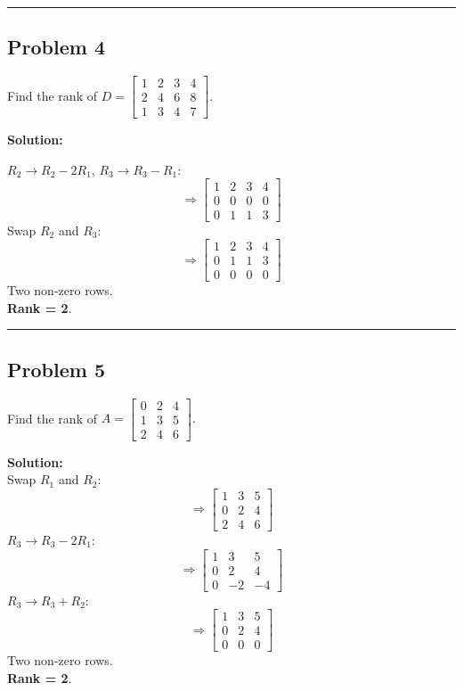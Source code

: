 \documentclass[
  letterpaper,
  DIV=11,
  numbers=noendperiod]{scrreprt}
\begin{document}
\begin{center}\rule{0.5\linewidth}{0.5pt}\end{center}

\subsection{Problem 4}\label{problem-4}

Find the rank of
\(D = \begin{bmatrix} 1 & 2 & 3 & 4 \\ 2 & 4 & 6 & 8 \\ 1 & 3 & 4 & 7 \end{bmatrix}.\)

\textbf{Solution:}

\(R_2 \to R_2 - 2R_1\), \(R_3 \to R_3 - R_1\): \[
\Rightarrow \begin{bmatrix} 1 & 2 & 3 & 4 \\ 0 & 0 & 0 & 0 \\ 0 & 1 & 1 & 3 \end{bmatrix}
\] Swap \(R_2\) and \(R_3\): \[
\Rightarrow \begin{bmatrix} 1 & 2 & 3 & 4 \\ 0 & 1 & 1 & 3 \\ 0 & 0 & 0 & 0 \end{bmatrix}
\] Two non-zero rows.\\
\textbf{Rank = 2}.

\begin{center}\rule{0.5\linewidth}{0.5pt}\end{center}

\subsection{Problem 5}\label{problem-5}

Find the rank of
\(A = \begin{bmatrix} 0 & 2 & 4 \\ 1 & 3 & 5 \\ 2 & 4 & 6 \end{bmatrix}.\)

\textbf{Solution:}\\
Swap \(R_1\) and \(R_2\): \[
\Rightarrow \begin{bmatrix} 1 & 3 & 5 \\ 0 & 2 & 4 \\ 2 & 4 & 6 \end{bmatrix}
\] \(R_3 \to R_3 - 2R_1\): \[
\Rightarrow \begin{bmatrix} 1 & 3 & 5 \\ 0 & 2 & 4 \\ 0 & -2 & -4 \end{bmatrix}
\] \(R_3 \to R_3 + R_2\): \[
\Rightarrow \begin{bmatrix} 1 & 3 & 5 \\ 0 & 2 & 4 \\ 0 & 0 & 0 \end{bmatrix}
\] Two non-zero rows.\\
\textbf{Rank = 2}.
\end{document}
